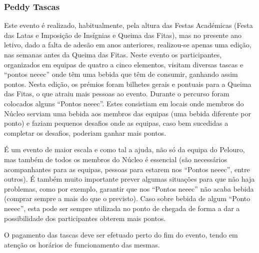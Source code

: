 
\subsubsection{Peddy Tascas} \label{subsubsec:atividades-cultura-peddy}

Este evento é realizado, habitualmente, pela altura das Festas Académicas (Festa das Latas e Imposição de Insígnias e Queima das Fitas), mas no presente ano letivo, dado a falta de adesão em anos anteriores, realizou-se apenas uma edição, nas semanas antes da Queima das Fitas. Neste evento os participantes, organizados em equipas de quatro a cinco elementos, visitam diversas tascas e “pontos \acrshort{neeec}” onde têm uma bebida que têm de consumir, ganhando assim pontos. Nesta edição, os prémios foram bilhetes gerais e pontuais para a Queima das Fitas, o que atraiu mais pessoas ao evento. Durante o percurso foram colocados alguns “Pontos \acrshort{neeec}”. Estes consistiam em locais onde membros do Núcleo serviam uma bebida aos membros das equipas (uma bebida diferente por ponto) e faziam pequenos desafios onde as equipas, caso bem sucedidas a completar os desafios, poderiam ganhar mais pontos.

É um evento de maior escala e como tal a ajuda, não só da equipa do Pelouro, mas também de todos os membros do Núcleo é essencial (são necessários acompanhantes para as equipas, pessoas para estarem nos “Pontos \acrshort{neeec}”, entre outros). É também muito importante prever algumas situações para que não haja problemas, como por exemplo, garantir que nos “Pontos \acrshort{neeec}” não acaba bebida (comprar sempre a mais do que o previsto). Caso sobre bebida de algum “Ponto \acrshort{neeec}”, esta pode ser sempre utilizada no ponto de chegada de forma a dar a possibilidade dos participantes obterem mais pontos.

O pagamento das tascas deve ser efetuado perto do fim do evento, tendo em atenção os horários de funcionamento das mesmas.

